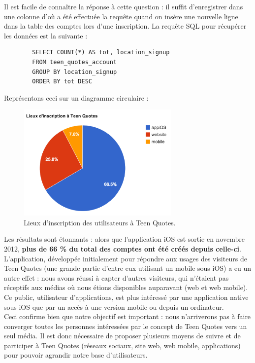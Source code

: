\documentclass{report}
\begin{document}
	Il est facile de connaître la réponse à cette question : il suffit d'enregistrer dans une colonne d'où a été effectuée la requête quand on insère une nouvelle ligne dans la table des comptes lors d'une inscription. La requête SQL pour récupérer les données est la suivante :
	\begin{lstlisting}
		SELECT COUNT(*) AS tot, location_signup
		FROM teen_quotes_account 
		GROUP BY location_signup 
		ORDER BY tot DESC
	\end{lstlisting}
	Représentons ceci sur un diagramme circulaire :
	\begin{figure}[H]
		\center
		\includegraphics[width=300px]{images/lieuInscription.png}
		\caption{Lieux d'inscription des utilisateurs à Teen Quotes.}
	\end{figure}
	Les résultats sont étonnants : alors que l'application iOS est sortie en novembre 2012, \textbf{plus de 66 \% du total des comptes ont été créés depuis celle-ci}.\\

	L'application, développée initialement pour répondre aux usages des visiteurs de Teen Quotes (une grande partie d'entre eux utilisant un mobile sous iOS) a eu un autre effet : nous avons réussi à capter d'autres visiteurs, qui n'étaient pas réceptifs aux médias où nous étions disponibles auparavant (web et web mobile). Ce public, utilisateur d'applications, est plus intéressé par une application native sous iOS que par un accès à une version mobile ou depuis un ordinateur.\\

	Ceci confirme bien que notre objectif est important : nous n'arriverons pas à faire converger toutes les personnes intéressées par le concept de Teen Quotes vers un seul média. Il est donc nécessaire de proposer plusieurs moyens de suivre et de participer à Teen Quotes (réseaux sociaux, site web, web mobile, applications) pour pouvoir agrandir notre base d'utilisateurs.

\end{document}
